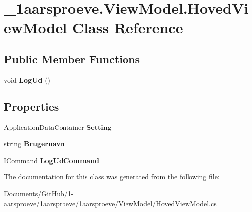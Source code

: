 \hypertarget{class__1aarsproeve_1_1_view_model_1_1_hoved_view_model}{}\section{\+\_\+1aarsproeve.\+View\+Model.\+Hoved\+View\+Model Class Reference}
\label{class__1aarsproeve_1_1_view_model_1_1_hoved_view_model}
\subsection*{Public Member Functions}
\begin{DoxyCompactItemize}
\item 
\hypertarget{class__1aarsproeve_1_1_view_model_1_1_hoved_view_model_ab9eeed2082ee607e4243559b1750eb8e}{}void {\bfseries Log\+Ud} ()\label{class__1aarsproeve_1_1_view_model_1_1_hoved_view_model_ab9eeed2082ee607e4243559b1750eb8e}

\end{DoxyCompactItemize}
\subsection*{Properties}
\begin{DoxyCompactItemize}
\item 
\hypertarget{class__1aarsproeve_1_1_view_model_1_1_hoved_view_model_afbb2eb2f33bdb6defe9979b80c6e79ff}{}Application\+Data\+Container {\bfseries Setting}\label{class__1aarsproeve_1_1_view_model_1_1_hoved_view_model_afbb2eb2f33bdb6defe9979b80c6e79ff}

\item 
\hypertarget{class__1aarsproeve_1_1_view_model_1_1_hoved_view_model_a48f0c876a1e3cd598fe3c4c7c65a760d}{}string {\bfseries Brugernavn}\label{class__1aarsproeve_1_1_view_model_1_1_hoved_view_model_a48f0c876a1e3cd598fe3c4c7c65a760d}

\item 
\hypertarget{class__1aarsproeve_1_1_view_model_1_1_hoved_view_model_ae541527e8e9063cc3337b229b93c7e48}{}I\+Command {\bfseries Log\+Ud\+Command}\label{class__1aarsproeve_1_1_view_model_1_1_hoved_view_model_ae541527e8e9063cc3337b229b93c7e48}

\end{DoxyCompactItemize}


The documentation for this class was generated from the following file\+:\begin{DoxyCompactItemize}
\item 
Documents/\+Git\+Hub/1-\/aarsproeve/1aarsproeve/1aarsproeve/\+View\+Model/Hoved\+View\+Model.\+cs\end{DoxyCompactItemize}
